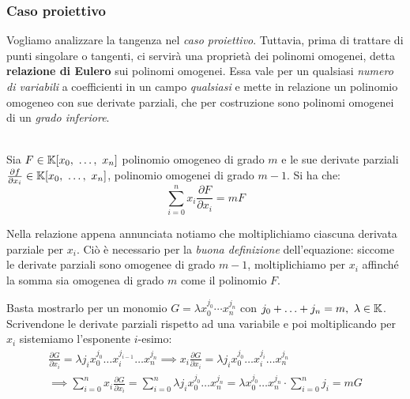 \subsubsection{Caso proiettivo}
Vogliamo analizzare la tangenza nel \textit{caso proiettivo}. Tuttavia, prima di trattare di punti singolare o tangenti, ci servirà una proprietà dei polinomi omogenei, detta \textbf{relazione di Eulero} sui polinomi omogenei. Essa vale per un qualsiasi \textit{numero di variabili} a coefficienti in un campo \textit{qualsiasi} e mette in relazione un polinomio omogeneo con sue derivate parziali, che per costruzione sono polinomi omogenei di un \textit{grado inferiore}.
\begin{theorema}~{}\\
Sia $F\in\mathbb{K}[x_0,\ \ldots,\ x_n]$ polinomio omogeneo di grado $m$ e le sue derivate parziali $\frac{\partial{f}}{\partial{x_i}}\in\kamp[x_0,\ \ldots,\ x_n]$, polinomio omogenei di grado $m-1$. Si ha che:
		\begin{equation}
			\sum_{i=0}^n x_i\frac{\partial{F}}{\partial{x_i}}=mF
		\end{equation}
	\vspace{-6mm}
\end{theorema}
Nella relazione appena annunciata notiamo che moltiplichiamo ciascuna derivata parziale per $x_i$. Ciò è necessario per la \textit{buona definizione} dell'equazione: siccome le derivate parziali sono omogenee di grado $m-1$, moltiplichiamo per $x_i$ affinché la somma sia omogenea di grado $m$ come il polinomio $F$.
\begin{demonstration}
	Basta mostrarlo per un monomio $G=\lambda x_0^{j_0}\cdots x_n^{j_n}$ con $j_0+\ldots+j_n=m,\ \lambda\in\kamp$. Scrivendone le derivate parziali rispetto ad una variabile e poi moltiplicando per $x_i$ sistemiamo l'esponente $i$-esimo:
		\begin{gather*}
			\frac{\partial{G}}{\partial{x_i}}=\lambda j_i x_0^{j_0}\ldots x_i^{j_{i-1}} \ldots x_n^{j_n} \implies  x_i \frac{\partial{G}}{\partial{x_i}}=\lambda j_i x_0^{j_0}\ldots x_i^{j_i} \ldots x_n^{j_n}\\
			\implies \sum_{i=0}^n x_i\frac{\partial{G}}{\partial{x_i}} = \sum_{i=0}^n \lambda j_i x_0^{j_0} \ldots x_n^{j_n}=\lambda x_0^{j_0}\ldots x_n^{j_n} \cdot \sum_{i=0}^n j_i =mG
		\end{gather*}
\end{demonstration}
